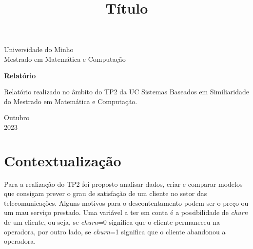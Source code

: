 \documentclass[a4paper, 12pt]{article}
\begin{document}
\begin{titlepage}
	\begin{center}

		\Huge{Universidade do Minho}\\
		\large{Mestrado em Matemática e Computação}\\ 
\vspace{15pt}
        
        \vspace{85pt}
        
		\textbf{\LARGE{Relatório}}
		\title{\large{Título}}
			
	\end{center}
\vspace{1,5cm}
	
	\begin{flushright}

   \begin{list}{}{
      \setlength{\leftmargin}{4.5cm}
      \setlength{\rightmargin}{0cm}
      \setlength{\labelwidth}{0pt}
      \setlength{\labelsep}{\leftmargin}}

      \item Relatório realizado no âmbito do TP2 da UC Sistemas Baseados em Similiaridade do Mestrado em Matemática e Computação.
   \end{list}
\end{flushright}
\vspace{1cm}
\begin{center}
		\vspace{\fill}
		 Outubro\\
		 2023
			\end{center}
\end{titlepage}
\newpage
\newpage
\tableofcontents
\thispagestyle{empty}

\newpage
{}
\section{Contextualização} 

Para a realização do TP2 foi proposto analisar dados, criar e comparar modelos que consigam prever o grau de satisfação de um cliente no setor das telecomunicações. Alguns motivos para o descontentamento podem ser o preço ou um mau serviço prestado. Uma variável a ter em conta é a possibilidade de \textit{churn} de um cliente, ou seja, se \textit{churn}=0 significa que o cliente permaneceu na operadora, por outro lado, se \textit{churn}=1 significa que o cliente abandonou a operadora.  
\end{document}
